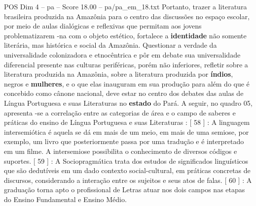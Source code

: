 \begin{textsample}{POS Dim 4 – pa – Score 18.00 – pa/pa\_em\_18.txt}
Portanto, trazer a literatura brasileira produzida na Amazônia para o centro das discussões no espaço escolar, por meio de aulas dialógicas e reflexivas que permitam aos jovens problematizarem -na com o objeto estético, fortalece a \textbf{identidade} não somente literária, mas histórica e social da Amazônia.
Questionar a verdade da universalidade colonizadora e etnocêntrica e pôr em debate sua universalidade diferencial presente nas culturas periféricas, porém não inferiores, refletir sobre a literatura produzida na Amazônia, sobre a literatura produzida por \textbf{índios}, negros e \textbf{mulheres}, e o que elas inauguram em sua produção para além do que é concebido como cânone nacional, deve estar no centro dos debates das aulas de Língua Portuguesa e suas Literaturas no \textbf{estado} do Pará.
A seguir, no quadro 05, apresenta -se a correlação entre as categorias de área e o campo de saberes e práticas do ensino de Língua Portuguesa e suas Literaturas : [ 58 ] : A linguagem intersemiótica é aquela se dá em mais de um meio, em mais de uma semiose, por exemplo, um livro que posteriormente passa por uma tradução e é interpretado em um filme.
A intersemiose possibilita o conhecimento de diversos códigos e suportes. [ 59 ] : A Sociopragmática trata dos estudos de significados linguísticos que são dedutíveis em um dado contexto social-cultural, em práticas concretas de discursos, considerando a interação entre os sujeitos e seus atos de falas. [ 60 ] : A graduação torna apto o profissional de Letras atuar nos dois campos nas etapas do Ensino Fundamental e Ensino Médio.

\end{textsample}
